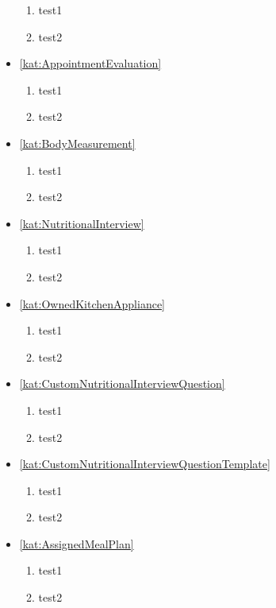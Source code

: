 \begin{itemize}[label={\textbf{Ograniczenia dla}}, wide, labelwidth=!, labelindent=0pt]
\begin{enumerate}[label={\textbf{OGR/\protect\threedigits{\arabic{enumi}}}}, wide, labelwidth=!, resume]
        \item test1
        \item test2
    \end{enumerate}
    \item\ref{kat:AppointmentEvaluation}
    \begin{enumerate}[label={\textbf{OGR/\protect\threedigits{\arabic{enumi}}}}, wide, labelwidth=!, resume]
        \item test1
        \item test2
    \end{enumerate}
    \item\ref{kat:BodyMeasurement}
    \begin{enumerate}[label={\textbf{OGR/\protect\threedigits{\arabic{enumi}}}}, wide, labelwidth=!, resume]
        \item test1
        \item test2
    \end{enumerate}
    \item\ref{kat:NutritionalInterview}
    \begin{enumerate}[label={\textbf{OGR/\protect\threedigits{\arabic{enumi}}}}, wide, labelwidth=!, resume]
        \item test1
        \item test2
    \end{enumerate}
    \item\ref{kat:OwnedKitchenAppliance}
    \begin{enumerate}[label={\textbf{OGR/\protect\threedigits{\arabic{enumi}}}}, wide, labelwidth=!, resume]
        \item test1
        \item test2
    \end{enumerate}
    \item\ref{kat:CustomNutritionalInterviewQuestion}
    \begin{enumerate}[label={\textbf{OGR/\protect\threedigits{\arabic{enumi}}}}, wide, labelwidth=!, resume]
        \item test1
        \item test2
    \end{enumerate}
    \item\ref{kat:CustomNutritionalInterviewQuestionTemplate}
    \begin{enumerate}[label={\textbf{OGR/\protect\threedigits{\arabic{enumi}}}}, wide, labelwidth=!, resume]
        \item test1
        \item test2
    \end{enumerate}
    \item\ref{kat:AssignedMealPlan}
    \begin{enumerate}[label={\textbf{OGR/\protect\threedigits{\arabic{enumi}}}}, wide, labelwidth=!, resume]
        \item test1
        \item test2
    \end{enumerate}
\end{itemize}

